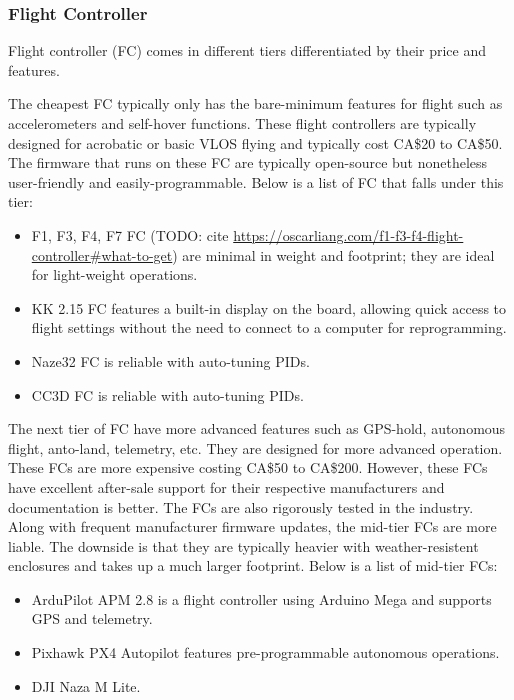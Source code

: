 \subsubsection{Flight Controller}

Flight controller (FC) comes in different tiers differentiated by their price and features. 

The cheapest FC typically only has the bare-minimum features for flight such as accelerometers and 
self-hover functions. These flight controllers are typically designed for acrobatic or basic VLOS 
flying and typically cost CA\$20 to CA\$50. The firmware that runs on these FC are typically 
open-source but nonetheless user-friendly and easily-programmable. Below is a list of FC that falls 
under this tier:

\begin{itemize}[noitemsep,topsep=0pt, parsep=4pt, partopsep=0pt]
    \item F1, F3, F4, F7 FC (TODO: cite \url{https://oscarliang.com/f1-f3-f4-flight-controller#what-to-get}) are minimal in weight and footprint; they are ideal for light-weight operations.
    \item KK 2.15 FC features a built-in display on the board, allowing quick access to flight settings without the need to connect to a computer for reprogramming.
    \item Naze32 FC is reliable with auto-tuning PIDs.
    \item CC3D FC is reliable with auto-tuning PIDs.
\end{itemize}

The next tier of FC have more advanced features such as GPS-hold, autonomous flight, anto-land, 
telemetry, etc. They are designed for more advanced operation. These FCs are more expensive costing 
CA\$50 to CA\$200. However, these FCs have excellent after-sale support for their respective 
manufacturers and documentation is better. The FCs are also rigorously tested in the industry. Along 
with frequent manufacturer firmware updates, the mid-tier FCs are more liable. The downside is that 
they are typically heavier with weather-resistent enclosures and takes up a much larger footprint. 
Below is a list of mid-tier FCs:

\begin{itemize}[noitemsep,topsep=0pt, parsep=4pt, partopsep=0pt]
    \item ArduPilot APM 2.8 is a flight controller using Arduino Mega and supports GPS and telemetry.
    \item Pixhawk PX4 Autopilot features pre-programmable autonomous operations.
    \item DJI Naza M Lite.
\end{itemize}

